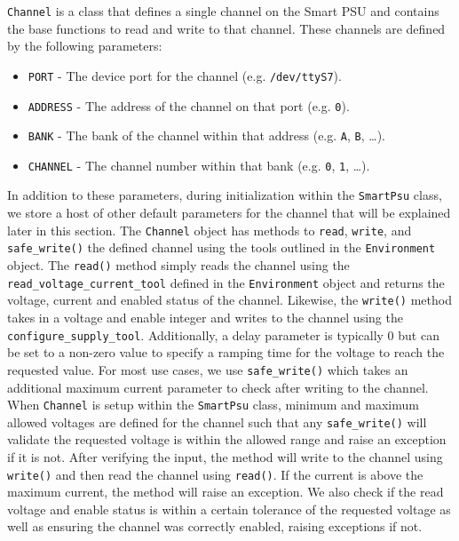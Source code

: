 \texttt{Channel} is a class that defines a single channel on the Smart PSU and contains the base functions to read and write to that channel.
These channels are defined by the following parameters:
\begin{itemize}
    \item \texttt{PORT} - The device port for the channel (e.g. \texttt{/dev/ttyS7}).
    \item \texttt{ADDRESS} - The address of the channel on that port (e.g. \texttt{0}).
    \item \texttt{BANK} - The bank of the channel within that address (e.g. \texttt{A}, \texttt{B}, \dots).
    \item \texttt{CHANNEL} - The channel number within that bank (e.g. \texttt{0}, \texttt{1}, \dots).
\end{itemize}
In addition to these parameters, during initialization within the \texttt{SmartPsu} class, we store a host of other default parameters for the channel that will be explained later in this section. 
The \texttt{Channel} object has methods to \texttt{read}, \texttt{write}, and \texttt{safe\_write()} the defined channel using the tools outlined in the \texttt{Environment} object.
The \texttt{read()} method simply reads the channel using the \texttt{read\_voltage\_current\_tool} defined in the \texttt{Environment} object and returns the voltage, current and enabled status of the channel.
Likewise, the \texttt{write()} method takes in a voltage and enable integer and writes to the channel using the \texttt{configure\_supply\_tool}. 
Additionally, a delay parameter is typically 0 but can be set to a non-zero value to specify a ramping time for the voltage to reach the requested value.
For most use cases, we use \texttt{safe\_write()} which takes an additional maximum current parameter to check after writing to the channel.
When \texttt{Channel} is setup within the \texttt{SmartPsu} class, minimum and maximum allowed voltages are defined for the channel such that any \texttt{safe\_write()} will validate the requested voltage is within the allowed range and raise an exception if it is not.
After verifying the input, the method will write to the channel using \texttt{write()} and then read the channel using \texttt{read()}.
If the current is above the maximum current, the method will raise an exception.
We also check if the read voltage and enable status is within a certain tolerance of the requested voltage as well as ensuring the channel was correctly enabled, raising exceptions if not. 

